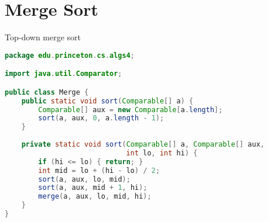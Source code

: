 \documentclass[8pt,a4paper,compress]{beamer}
\begin{document}
\section{Merge Sort}
\begin{frame}[fragile]
\pause

Top-down merge sort

\begin{lstlisting}[language=Java]
package edu.princeton.cs.algs4;

import java.util.Comparator;

public class Merge {
    public static void sort(Comparable[] a) {
        Comparable[] aux = new Comparable[a.length]; 
        sort(a, aux, 0, a.length - 1);
    }
    
    private static void sort(Comparable[] a, Comparable[] aux, 
                             int lo, int hi) {
        if (hi <= lo) { return; }
        int mid = lo + (hi - lo) / 2;
        sort(a, aux, lo, mid); 
        sort(a, aux, mid + 1, hi); 
        merge(a, aux, lo, mid, hi);
    }
}
\end{lstlisting}
\end{frame}

\begin{frame}[fragile]
\pause

Trace of merge sort
\begin{center}
}
\end{center}
\end{frame}
\end{document}
